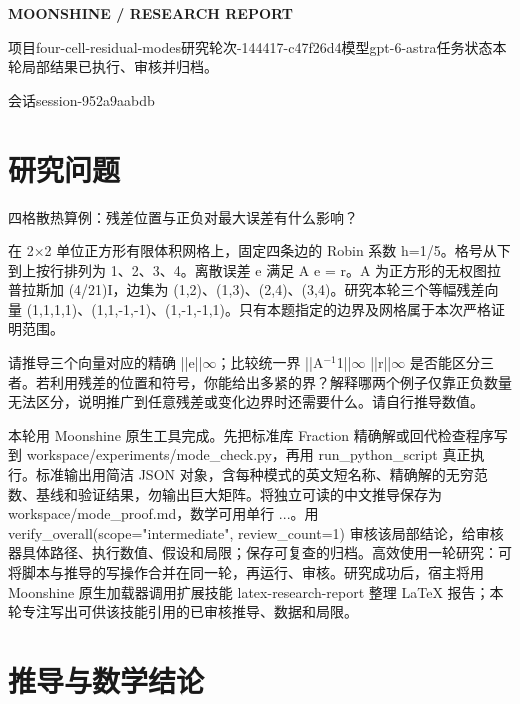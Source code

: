 \documentclass[UTF8,a4paper,11pt]{ctexart}
\begin{document}
{\small\sffamily\bfseries\color{accent} MOONSHINE \quad / \quad RESEARCH REPORT}\par
{}\par
\vspace{.25em}{\color{accent}\rule{\linewidth}{.8pt}}\par
{\small\color{muted} 项目\enspace four-\allowbreak{}cell-\allowbreak{}re\allowbreak{}sidual-\allowbreak{}modes\allowbreak{}\quad 研究轮次-\allowbreak{}144\allowbreak{}417-\allowbreak{}c47f26d4\allowbreak{}\quad 模型\enspace gpt-\allowbreak{}6-\allowbreak{}astra\quad 任务状态\enspace 本轮局部结果已执行、审核\allowbreak{}并归档。}\par
{\small\color{muted} 会话\enspace session-\allowbreak{}952a\allowbreak{}9aabdb}\par
\section{研究问题}
四格散热算例：残差位置与正负对最大误差有什么影响？

在 2\ensuremath{\times }2 单位正方形有限体积网格上，固定四条边的 Robin 系数 h=1/5。格号从下到上按行排列为 1、2、3、4。离散误差 e 满足 A e = r。A 为正方形的无权图拉普拉斯加 (4/21)I，边集为 (1,2)、(1,3)、(2,4)、(3,4)。研究本轮三个等幅残差向量 (1,1,1,1)、(1,1,-1,-1)、(1,-1,-1,1)。只有本题指定的边界及网格属于本次严格证明范围。

请推导三个向量对应的精确 ||e||\ensuremath{\infty }；比较统一界 ||A\ensuremath{{}^{-1}}1||\ensuremath{\infty } ||r||\ensuremath{\infty } 是否能区分三者。若利用残差的位置和符号，你能给出多紧的界？解释哪两个例子仅靠正负数量无法区分，说明推广到任意残差或变化边界时还需要什么。请自行推导数值。

本轮用 Moonshine 原生工具完成。先把标准库 Fraction 精确解或回代检查程序写到 workspace/experiments/mode\_check.py，再用 run\_python\_script 真正执行。标准输出用简洁 JSON 对象，含每种模式的英文短名称、精确解的无穷范数、基线和验证结果，勿输出巨大矩阵。将独立可读的中文推导保存为 workspace/mode\_proof.md，数学可用单行 \(...\)。用 verify\_overall(scope="intermediate", review\_count=1) 审核该局部结论，给审核器具体路径、执行数值、假设和局限；保存可复查的归档。高效使用一轮研究：可将脚本与推导的写操作合并在同一轮，再运行、审核。研究成功后，宿主将用 Moonshine 原生加载器调用扩展技能 latex-research-report 整理 LaTeX 报告；本轮专注写出可供该技能引用的已审核推导、数据和局限。
\section{推导与数学结论}
\end{document}
